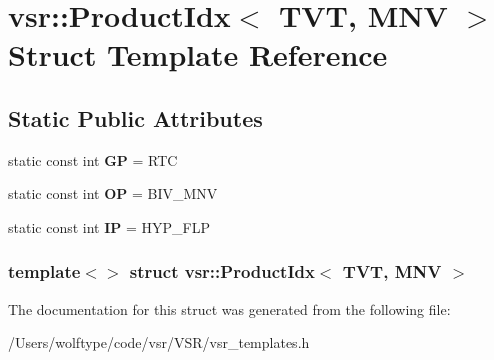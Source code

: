 \hypertarget{structvsr_1_1_product_idx_3_01_t_v_t_00_01_m_n_v_01_4}{\section{vsr\-:\-:Product\-Idx$<$ T\-V\-T, M\-N\-V $>$ Struct Template Reference}
\label{structvsr_1_1_product_idx_3_01_t_v_t_00_01_m_n_v_01_4}
}
\subsection*{Static Public Attributes}
\begin{DoxyCompactItemize}
\item 
\hypertarget{structvsr_1_1_product_idx_3_01_t_v_t_00_01_m_n_v_01_4_a4b8b6d3cf2e34a3d3faf403b79be952e}{static const int {\bfseries G\-P} = R\-T\-C}\label{structvsr_1_1_product_idx_3_01_t_v_t_00_01_m_n_v_01_4_a4b8b6d3cf2e34a3d3faf403b79be952e}

\item 
\hypertarget{structvsr_1_1_product_idx_3_01_t_v_t_00_01_m_n_v_01_4_aa2b7af3008b91ecd7c06dc6e41036373}{static const int {\bfseries O\-P} = B\-I\-V\-\_\-\-M\-N\-V}\label{structvsr_1_1_product_idx_3_01_t_v_t_00_01_m_n_v_01_4_aa2b7af3008b91ecd7c06dc6e41036373}

\item 
\hypertarget{structvsr_1_1_product_idx_3_01_t_v_t_00_01_m_n_v_01_4_a158d0d689763dbb43ed69b898e1a8c81}{static const int {\bfseries I\-P} = H\-Y\-P\-\_\-\-F\-L\-P}\label{structvsr_1_1_product_idx_3_01_t_v_t_00_01_m_n_v_01_4_a158d0d689763dbb43ed69b898e1a8c81}

\end{DoxyCompactItemize}
\subsubsection*{template$<$$>$ struct vsr\-::\-Product\-Idx$<$ T\-V\-T, M\-N\-V $>$}



The documentation for this struct was generated from the following file\-:\begin{DoxyCompactItemize}
\item 
/\-Users/wolftype/code/vsr/\-V\-S\-R/vsr\-\_\-templates.\-h\end{DoxyCompactItemize}

